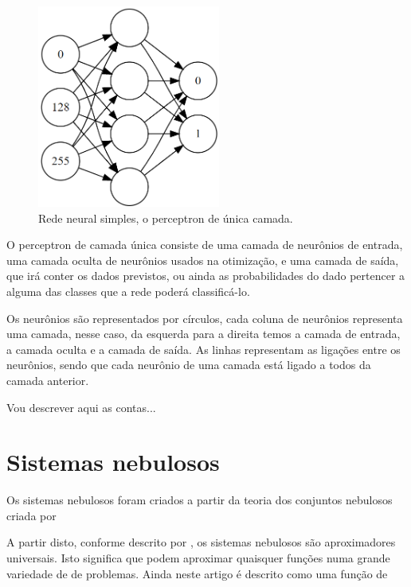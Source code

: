 \begin{figure}[htb]
\centering
\includegraphics[width=6cm]{figuras/perceptron}
\caption{\label{fig:perceptron}Rede neural simples, o perceptron de única camada. }
\end{figure}

O perceptron de camada única consiste de uma camada de neurônios de entrada, uma camada oculta de neurônios usados na otimização, e uma camada de saída, que irá conter os dados previstos, ou ainda as probabilidades do dado pertencer a alguma das classes que a rede poderá classificá-lo.

Os neurônios são representados por círculos, cada coluna de neurônios representa uma camada, nesse caso, da esquerda para a direita temos a camada de entrada, a camada oculta e a camada de saída. As linhas representam as ligações entre os neurônios, sendo que cada neurônio de uma camada está ligado a todos da camada anterior.

Vou descrever aqui as contas...

\section{Sistemas nebulosos}

Os sistemas nebulosos foram criados a partir da teoria dos conjuntos nebulosos criada por \cite{fuzzy_1}

A partir disto, conforme descrito por \citep{fuzzy_2}, os sistemas nebulosos são aproximadores universais. Isto significa que podem aproximar quaisquer funções numa grande variedade de de problemas. Ainda neste artigo é descrito como uma função de 